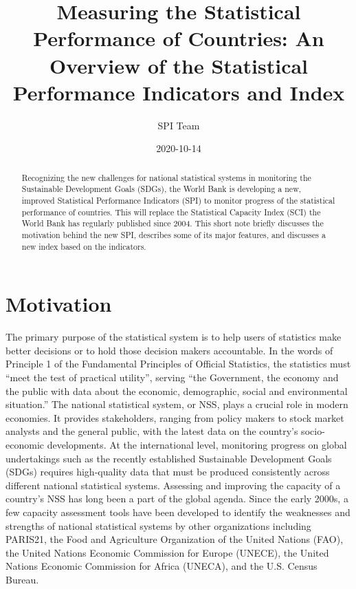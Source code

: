 \documentclass[
]{article}
\title{Measuring the Statistical Performance of Countries: An Overview of the Statistical Performance Indicators and Index}
\author{SPI Team}
\date{2020-10-14}
\begin{document}
\maketitle
\begin{abstract}
Recognizing the new challenges for national statistical systems in monitoring the Sustainable Development Goals (SDGs), the World Bank is developing a new, improved Statistical Performance Indicators (SPI) to monitor progress of the statistical performance of countries. This will replace the Statistical Capacity Index (SCI) the World Bank has regularly published since 2004. This short note briefly discusses the motivation behind the new SPI, describes some of its major features, and discusses a new index based on the indicators.
\end{abstract}

{
\setcounter{tocdepth}{2}
\tableofcontents
}
\hypertarget{motivation}{%
\section{Motivation}\label{motivation}}

The primary purpose of the statistical system is to help users of statistics make better decisions or to hold those decision makers accountable. In the words of Principle 1 of the Fundamental Principles of Official Statistics, the statistics must ``meet the test of practical utility'', serving ``the Government, the economy and the public with data about the economic, demographic, social and environmental situation.''
The national statistical system, or NSS, plays a crucial role in modern economies. It provides stakeholders, ranging from policy makers to stock market analysts and the general public, with the latest data on the country's socio-economic developments. At the international level, monitoring progress on global undertakings such as the recently established Sustainable Development Goals (SDGs) requires high-quality data that must be produced consistently across different national statistical systems. Assessing and improving the capacity of a country's NSS has long been a part of the global agenda. Since the early 2000s, a few capacity assessment tools have been developed to identify the weaknesses and strengths of national statistical systems by other organizations including PARIS21, the Food and Agriculture Organization of the United Nations (FAO), the United Nations Economic Commission for Europe (UNECE), the United Nations Economic Commission for Africa (UNECA), and the U.S. Census Bureau.
\end{document}
